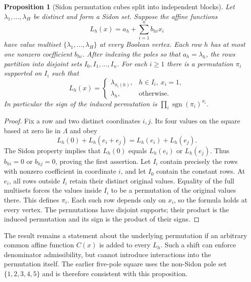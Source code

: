 \documentclass[11pt]{article}
\newtheorem{proposition}{Proposition}
\begin{document}
\begin{proposition}[Sidon permutation cubes split into independent blocks]
Let $\lambda_1,\ldots,\lambda_H$ be distinct and form a Sidon set.
Suppose the affine functions
\[
 L_h(x)=a_h+\sum_{i=1}^n b_{hi}x_i
\]
have value multiset $\{\lambda_1,\ldots,\lambda_H\}$ at every Boolean
vertex. Each row $h$ has at most one nonzero coefficient $b_{hi}$.
After indexing the poles so that $a_h=\lambda_h$, the rows partition
into disjoint sets $I_0,I_1,\ldots,I_n$. For each $i\ge1$ there is a
permutation $\pi_i$ supported on $I_i$ such that
\[
 L_h(x)=\begin{cases}
 \lambda_{\pi_i(h)},&h\in I_i,\ x_i=1,\\
 \lambda_h,&\text{otherwise}.
 \end{cases}
\]
In particular the sign of the induced permutation is
$\prod_i\operatorname{sgn}(\pi_i)^{x_i}$.
\end{proposition}
\begin{proof}
Fix a row and two distinct coordinates $i,j$. Its four values on the
square based at zero lie in $\Lambda$ and obey
\[
 L_h(0)+L_h(e_i+e_j)=L_h(e_i)+L_h(e_j).
\]
The Sidon property implies that $L_h(0)$ equals $L_h(e_i)$ or
$L_h(e_j)$. Thus $b_{hi}=0$ or $b_{hj}=0$, proving the first assertion.
Let $I_i$ contain precisely the rows with nonzero coefficient in
coordinate $i$, and let $I_0$ contain the constant rows. At $e_i$,
all rows outside $I_i$ retain their distinct original values. Equality
of the full multisets forces the values inside $I_i$ to be a permutation
of the original values there. This defines $\pi_i$. Each such row depends
only on $x_i$, so the formula holds at every vertex. The permutations
have disjoint supports; their product is the induced permutation and
its sign is the product of their signs.
\end{proof}

The result remains a statement about the underlying permutation if
an arbitrary common affine function $C(x)$ is added to every $L_h$.
Such a shift can enforce denominator admissibility, but cannot introduce
interactions into the permutation itself. The earlier five-pole square
uses the non-Sidon pole set $\{1,2,3,4,5\}$ and is therefore consistent
with this proposition.
\end{document}
